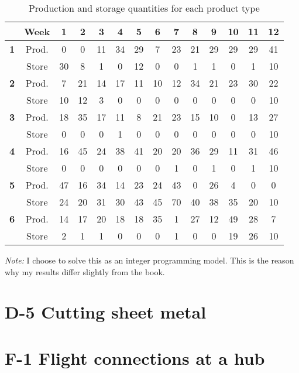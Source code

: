 \documentclass[11pt,oneside]{article}
\begin{document}
\begin{table}[h]
    \center
    \caption{Production and storage quantities for each product type}
\begin{tabular}{cccccccccccccc}
    \hline
    & \textbf{Week} & \textbf{1} &\textbf{2} &\textbf{3} &\textbf{4} &\textbf{5} &\textbf{6} &\textbf{7} &\textbf{8} &\textbf{9} &\textbf{10} &\textbf{11} &\textbf{12} \\
    \hline
    \textbf{1} & Prod. & 0 & 0 & 11 & 34 & 29 & 7 & 23 & 21 & 29 & 29 & 29 & 41\\
& Store & 30 & 8 & 1 & 0 & 12 & 0 & 0 & 1 & 1 & 0 & 1 & 10\\
\textbf{2} & Prod. & 7 & 21 & 14 & 17 & 11 & 10 & 12 & 34 & 21 & 23 & 30 & 22\\
& Store & 10 & 12 & 3 & 0 & 0 & 0 & 0 & 0 & 0 & 0 & 0 & 10\\
\textbf{3} & Prod. & 18 & 35 & 17 & 11 & 8 & 21 & 23 & 15 & 10 & 0 & 13 & 27\\
& Store & 0 & 0 & 0 & 1 & 0 & 0 & 0 & 0 & 0 & 0 & 0 & 10\\
\textbf{4} & Prod. & 16 & 45 & 24 & 38 & 41 & 20 & 20 & 36 & 29 & 11 & 31 & 46\\
& Store & 0 & 0 & 0 & 0 & 0 & 0 & 1 & 0 & 1 & 0 & 1 & 10\\
\textbf{5} & Prod. & 47 & 16 & 34 & 14 & 23 & 24 & 43 & 0 & 26 & 4 & 0 & 0\\
& Store & 24 & 20 & 31 & 30 & 43 & 45 & 70 & 40 & 38 & 35 & 20 & 10\\
\textbf{6} & Prod. & 14 & 17 & 20 & 18 & 18 & 35 & 1 & 27 & 12 & 49 & 28 & 7\\
& Store & 2 & 1 & 1 & 0 & 0 & 0 & 1 & 0 & 0 & 19 & 26 & 10\\
\hline
\end{tabular}
\end{table}

\emph{Note:} I choose to solve this as an integer programming model. This is
the reason why my results differ slightly from the book.

\section{D-5 Cutting sheet metal}



\section{F-1 Flight connections at a hub}
\end{document}

